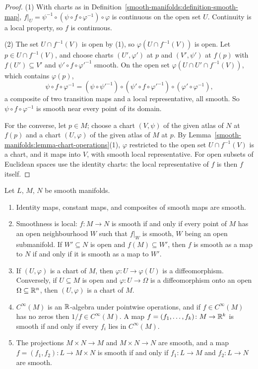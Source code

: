 \begin{proof}
(1) With charts as in Definition~\ref{smooth-manifolds:definition-smooth-map}, $f|_U = \psi^{-1} \circ (\psi \circ f \circ \varphi^{-1}) \circ \varphi$ is
continuous on the open set $U$. Continuity is a local property, so $f$ is continuous.

(2) The set $U \cap f^{-1}(V)$ is open by (1), so $\varphi(U \cap f^{-1}(V))$ is open. Let $p \in U \cap f^{-1}(V)$, and choose charts $(U', \varphi')$ at $p$ and
$(V', \psi')$ at $f(p)$ with $f(U') \subseteq V'$ and $\psi' \circ f \circ \varphi'^{-1}$ smooth. On the open set $\varphi(U \cap U' \cap f^{-1}(V))$, which
contains $\varphi(p)$,
\[
\psi \circ f \circ \varphi^{-1} = (\psi \circ \psi'^{-1}) \circ (\psi' \circ f \circ \varphi'^{-1}) \circ (\varphi' \circ \varphi^{-1}),
\]
a composite of two transition maps and a local representative, all smooth. So $\psi \circ f \circ \varphi^{-1}$ is smooth near every point of its domain.

For the converse, let $p \in M$; choose a chart $(V, \psi)$ of the given atlas of $N$ at $f(p)$ and a chart $(U, \varphi)$ of the given atlas of $M$ at $p$. By
Lemma~\ref{smooth-manifolds:lemma-chart-operations}(1), $\varphi$ restricted to the open set $U \cap f^{-1}(V)$ is a chart, and it maps into $V$, with smooth
local representative. For open subsets of Euclidean spaces use the identity charts: the local representative of $f$ is then $f$ itself.
\end{proof}

\begin{proposition}\label{smooth-manifolds:proposition-smooth-maps}
Let $L$, $M$, $N$ be smooth manifolds.
\begin{enumerate}
\item Identity maps, constant maps, and composites of smooth maps are smooth.
\item Smoothness is local: $f \colon M \to N$ is smooth if and only if every point of $M$ has an open neighbourhood $W$ such that $f|_W$ is smooth, $W$ being
an open submanifold. If $W' \subseteq N$ is open and $f(M) \subseteq W'$, then $f$ is smooth as a map to $N$ if and only if it is smooth as a map to $W'$.
\item If $(U, \varphi)$ is a chart of $M$, then $\varphi \colon U \to \varphi(U)$ is a diffeomorphism. Conversely, if $U \subseteq M$ is open and
$\varphi \colon U \to \Omega$ is a diffeomorphism onto an open $\Omega \subseteq \mathbb{R}^n$, then $(U, \varphi)$ is a chart of $M$.
\item $C^\infty(M)$ is an $\mathbb{R}$-algebra under pointwise operations, and if $f \in C^\infty(M)$ has no zeros then $1/f \in C^\infty(M)$. A map
$f = (f_1, \ldots, f_k) \colon M \to \mathbb{R}^k$ is smooth if and only if every $f_i$ lies in $C^\infty(M)$.
\item The projections $M \times N \to M$ and $M \times N \to N$ are smooth, and a map $f = (f_1, f_2) \colon L \to M \times N$ is smooth if and only if
$f_1 \colon L \to M$ and $f_2 \colon L \to N$ are smooth.
\end{enumerate}
\end{proposition}

